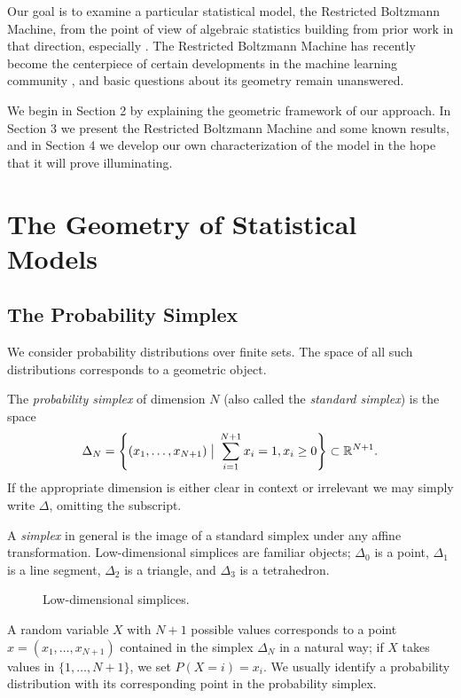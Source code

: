 \documentclass[cclicense]{hmcthesis}
\newcommand*{\vbar}{\;\big\vert\;}
\numberwithin{equation}{section}
\begin{document}
    Our goal is to examine a particular statistical model, the Restricted
    Boltzmann Machine, from the point of view of algebraic statistics building
    from prior work in that direction, especially \citep{CMS09}.  The Restricted
    Boltzmann Machine has recently become the centerpiece of certain
    developments in the machine learning community \citep{Hin07}, and basic
    questions about its geometry remain unanswered.  
    
    We begin in Section 2 by explaining the geometric framework of our approach.
    In Section 3 we present the Restricted Boltzmann Machine and some known
    results, and in Section 4 we develop our own characterization of the model
    in the hope that it will prove illuminating.

\chapter{The Geometry of Statistical Models}
    \section{The Probability Simplex}

    We consider probability distributions over finite sets.  The space of all
    such distributions corresponds to a geometric object.
    
    \begin{definition} 
        The \emph{probability simplex} of dimension $N$ (also
        called the \emph{standard simplex}) is the space
        \[
            \Delta_N = 
            \left\{(x_1, \ldots, x_{N+1}) \vbar \sum_{i=1}^{N+1} x_i= 1, x_i \ge 0 \right\} 
            \subset
            \R^{N+1}.
        \]
        If the appropriate dimension is either clear in context or irrelevant we
        may simply write $\Delta$, omitting the subscript.
    \end{definition}
    A \emph{simplex} in general is the image of a standard simplex under any
    affine transformation.  Low-dimensional simplices are familiar objects;
    $\Delta_0$ is a point, $\Delta_1$ is a line segment, $\Delta_2$ is a
    triangle, and $\Delta_3$ is a tetrahedron.
    \begin{figure}[H]
        \centering
        \caption{Low-dimensional simplices.}
    \end{figure}
    \noindent A random variable $X$ with $N+1$ possible values corresponds to a point $x =
    (x_1, \ldots, x_{N+1})$ contained in the simplex $\Delta_N$ in a natural
    way; if $X$ takes values in $\{1, \ldots, N+1\}$, we set $P(X = i) = x_i$.
    We usually identify a probability distribution with its corresponding
    point in the probability simplex.  
    
\end{document}
